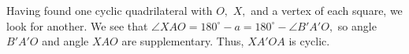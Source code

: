 










Having found one cyclic quadrilateral with $O,$ $X,$ and a vertex of each square, we look for another. We see that $\angle XAO = 180^\circ - a = 180^\circ - \angle B'A'O,$ so angle $B'A'O$ and angle $XAO$ are supplementary. Thus, $XA'OA$ is cyclic.






